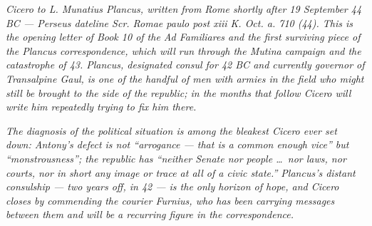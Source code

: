 
\textit{Cicero to L. Munatius Plancus, written from Rome
shortly after 19 September 44 BC --- Perseus dateline
\textit{Scr. Romae paulo post xiii K. Oct. a. 710 (44)}.
This is the opening letter of Book 10 of the
\textit{Ad Familiares} and the first surviving piece of the
Plancus correspondence, which will run through the Mutina
campaign and the catastrophe of 43. Plancus, designated
consul for 42 BC and currently governor of Transalpine
Gaul, is one of the handful of men with armies in the
field who might still be brought to the side of the
republic; in the months that follow Cicero will write
him repeatedly trying to fix him there.}

\textit{The diagnosis of the political situation is among
the bleakest Cicero ever set down: Antony's defect is not
``arrogance --- that is a common enough vice'' but
``monstrousness''; the republic has ``neither Senate nor
people \dots\ nor laws, nor courts, nor in short any image
or trace at all of a civic state.'' Plancus's distant
consulship --- two years off, in 42 --- is the only
horizon of hope, and Cicero closes by commending the
courier Furnius, who has been carrying messages between
them and will be a recurring figure in the correspondence.}
